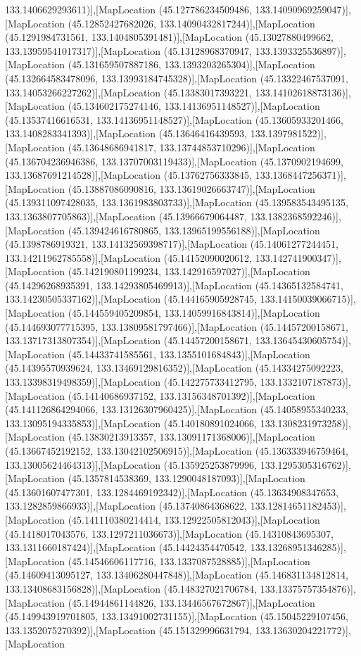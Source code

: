 133.1406629293611)],[MapLocation (45.127786234509486, 133.14090969259047)],[MapLocation (45.12852427682026, 133.14090432817244)],[MapLocation (45.1291984731561, 133.1404805391481)],[MapLocation (45.13027880499662, 133.13959541017317)],[MapLocation (45.13128968370947, 133.1393325536897)],[MapLocation (45.131659507887186, 133.1393203265304)],[MapLocation (45.132664583478096, 133.13993184745328)],[MapLocation (45.13322467537091, 133.14053266227262)],[MapLocation (45.13383017393221, 133.14102618873136)],[MapLocation (45.134602175274146, 133.14136951148527)],[MapLocation (45.13537416616531, 133.14136951148527)],[MapLocation (45.13605933201466, 133.1408283341393)],[MapLocation (45.13646416439593, 133.1397981522)],[MapLocation (45.13648686941817, 133.13744853710296)],[MapLocation (45.136704236946386, 133.13707003119433)],[MapLocation (45.1370902194699, 133.13687691214528)],[MapLocation (45.13762756333845, 133.1368447256371)],[MapLocation (45.13887086090816, 133.13619026663747)],[MapLocation (45.139311097428035, 133.1361983803733)],[MapLocation (45.139583543495135, 133.1363807705863)],[MapLocation (45.13966679064487, 133.1382368592246)],[MapLocation (45.139424616780865, 133.13965199556188)],[MapLocation (45.1398786919321, 133.14132569398717)],[MapLocation (45.14061277244451, 133.14211962785558)],[MapLocation (45.14152090020612, 133.142741900347)],[MapLocation (45.142190801199234, 133.142916597027)],[MapLocation (45.14296268935391, 133.14293805469913)],[MapLocation (45.14365132584741, 133.14230505337162)],[MapLocation (45.144165905928745, 133.14150039066715)],[MapLocation (45.144559405209854, 133.14059916843814)],[MapLocation (45.144693077715395, 133.13809581797466)],[MapLocation (45.14457200158671, 133.13717313807354)],[MapLocation (45.14457200158671, 133.13645430605754)],[MapLocation (45.14433741585561, 133.1355101684843)],[MapLocation (45.14395570939624, 133.13469129816352)],[MapLocation (45.14334275092223, 133.13398319498359)],[MapLocation (45.142275733412795, 133.1332107187873)],[MapLocation (45.14140686937152, 133.13156348701392)],[MapLocation (45.141126864294066, 133.13126307960425)],[MapLocation (45.14058955340233, 133.13095194335853)],[MapLocation (45.140180891024066, 133.1308231973258)],[MapLocation (45.13830213913357, 133.13091171368006)],[MapLocation (45.13667452192152, 133.13042102506915)],[MapLocation (45.136333946759464, 133.13005624464313)],[MapLocation (45.135925253879996, 133.1295305316762)],[MapLocation (45.1357814538369, 133.1290048187093)],[MapLocation (45.13601607477301, 133.1284469192342)],[MapLocation (45.13634908347653, 133.1282859866933)],[MapLocation (45.13740864368622, 133.12814651182453)],[MapLocation (45.141110380214414, 133.12922505812043)],[MapLocation (45.1418017043576, 133.1297211036673)],[MapLocation (45.14310843695307, 133.1311660187424)],[MapLocation (45.14424354470542, 133.13268951346285)],[MapLocation (45.14546606117716, 133.1337087528885)],[MapLocation (45.14609413095127, 133.13406280447848)],[MapLocation (45.146831134812814, 133.13408683156828)],[MapLocation (45.148327021706784, 133.13375757354876)],[MapLocation (45.14944861144826, 133.13446567672867)],[MapLocation (45.149943919701805, 133.13491002731155)],[MapLocation (45.15045229107456, 133.1352075270392)],[MapLocation (45.151329996631794, 133.13630204221772)],[MapLocation 